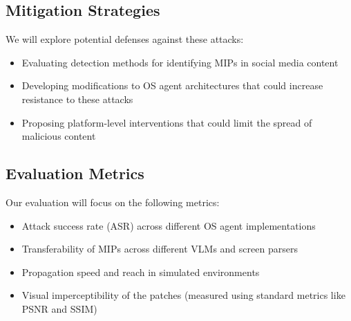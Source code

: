 \documentclass[sigconf]{acmart}
\begin{document}
\subsection{Mitigation Strategies}
We will explore potential defenses against these attacks:
\begin{itemize}
    \item Evaluating detection methods for identifying MIPs in social media content
    \item Developing modifications to OS agent architectures that could increase resistance to these attacks
    \item Proposing platform-level interventions that could limit the spread of malicious content
\end{itemize}

\subsection{Evaluation Metrics}
Our evaluation will focus on the following metrics:
\begin{itemize}
    \item Attack success rate (ASR) across different OS agent implementations
    \item Transferability of MIPs across different VLMs and screen parsers
    \item Propagation speed and reach in simulated environments
    \item Visual imperceptibility of the patches (measured using standard metrics like PSNR and SSIM)
\end{itemize}




\balance %
\end{document}
